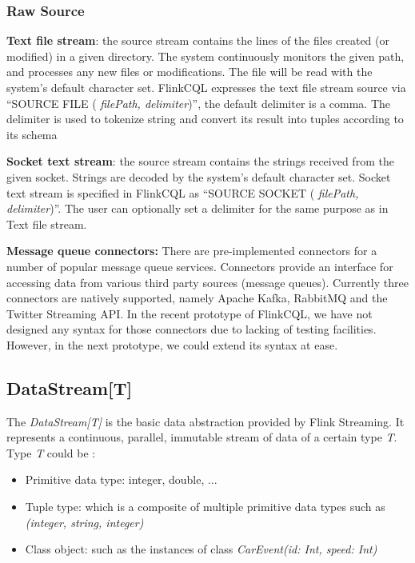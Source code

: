 \subsubsection*{Raw Source}


\quad\textbf{Text file stream}: the source stream contains the lines of the files created (or modified) in a given directory. The system continuously monitors the given path, and processes any new files or modifications. The file will be read with the system’s default character set. FlinkCQL expresses the text file stream source via ``SOURCE FILE ( \textit{filePath, delimiter})'', the default delimiter is a comma. The delimiter is used to tokenize string and convert its result into tuples according to its schema


\textbf{Socket text stream}: the source stream contains the strings received from the given socket. Strings are decoded by the system’s default character set. Socket text stream is specified in FlinkCQL as ``SOURCE SOCKET ( \textit{filePath, delimiter})''. The user can optionally set a delimiter for the same purpose as in Text file stream.


\textbf{Message queue connectors:} There are pre-implemented connectors for a number of popular message queue services. Connectors provide an interface for accessing data from various third party sources (message queues). Currently three connectors are natively supported, namely Apache Kafka, RabbitMQ and the Twitter Streaming API. In the recent prototype of FlinkCQL, we have not designed any syntax for those connectors due to lacking of testing facilities. However, in the next prototype, we could extend its syntax at ease.

\subsection*{DataStream[T]}
The \textit{DataStream[T]} is the basic data abstraction provided by Flink Streaming. It represents a continuous, parallel, immutable stream of data of a certain type \textit{T}. Type \textit{T} could be :
\begin{itemize}
\item Primitive data type: integer, double, ...
\item Tuple type: which is a composite of multiple primitive data types such as \textit{(integer, string, integer)}
\item Class object: such as the instances of class \textit{CarEvent(id: Int, speed: Int)}
\end{itemize} 

